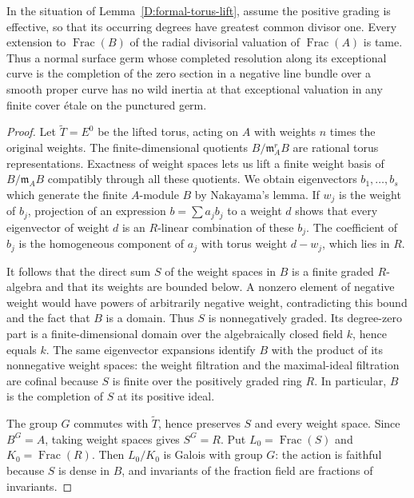 \begin{proposition}
\label{D:graded-cone-tame}
In the situation of Lemma~\ref{D:formal-torus-lift}, assume the
positive grading is effective, so that its occurring degrees
have greatest common divisor one.  Every extension to
$\operatorname{Frac}(B)$ of the radial divisorial valuation of
$\operatorname{Frac}(A)$ is tame.  Thus a normal surface germ
whose completed resolution along its exceptional curve is the
completion of the zero section in a negative line bundle over
a smooth proper curve has no wild inertia at that exceptional
valuation in any finite cover \'etale on the punctured germ.
\end{proposition}
\begin{proof}
Let $\widetilde T=E^0$ be the lifted torus, acting on $A$ with
weights $n$ times the original weights.  The finite-dimensional
quotients $B/\mathfrak m_A^rB$ are rational torus
representations.  Exactness of weight spaces lets us lift a
finite weight basis of $B/\mathfrak m_AB$ compatibly through
all these quotients.  We obtain eigenvectors $b_1,\ldots,b_s$
which generate the finite $A$-module $B$ by Nakayama's lemma.
If $w_j$ is the weight of $b_j$, projection of an expression
$b=\sum a_jb_j$ to a weight $d$ shows that every eigenvector
of weight $d$ is an $R$-linear combination of these $b_j$.
The coefficient of $b_j$ is the homogeneous component of
$a_j$ with torus weight $d-w_j$, which lies in $R$.

It follows that the direct sum $S$ of the weight spaces in $B$
is a finite graded $R$-algebra and that its weights are bounded
below.  A nonzero element of negative weight would have powers
of arbitrarily negative weight, contradicting this bound and
the fact that $B$ is a domain.  Thus $S$ is nonnegatively graded.
Its degree-zero part is a finite-dimensional domain over the
algebraically closed field $k$, hence equals $k$.
The same eigenvector expansions identify $B$ with the product
of its nonnegative weight spaces: the weight filtration and
the maximal-ideal filtration are cofinal because $S$ is finite
over the positively graded ring $R$.  In particular, $B$ is
the completion of $S$ at its positive ideal.

The group $G$ commutes with $\widetilde T$, hence preserves $S$
and every weight space.  Since $B^G=A$, taking weight spaces
gives $S^G=R$.  Put $L_0=\operatorname{Frac}(S)$ and
$K_0=\operatorname{Frac}(R)$.  Then $L_0/K_0$ is Galois with
group $G$: the action is faithful because $S$ is dense in $B$,
and invariants of the fraction field are fractions of invariants.


\end{proof}
